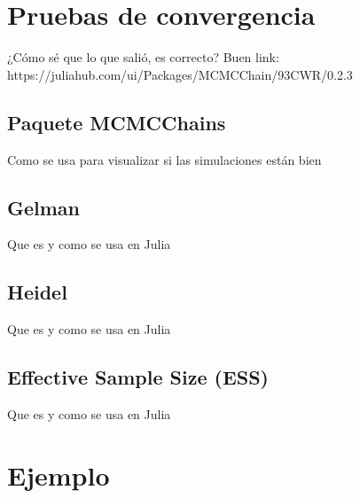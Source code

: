 \section{Pruebas de convergencia}
¿Cómo sé que lo que salió, es correcto?
Buen link: https://juliahub.com/ui/Packages/MCMCChain/93CWR/0.2.3

\subsection{Paquete MCMCChains}
Como se usa para visualizar si las simulaciones están bien

\subsection{Gelman}
Que es y como se usa en Julia

\subsection{Heidel}
Que es y como se usa en Julia

\subsection{Effective Sample Size (ESS)}
Que es y como se usa en Julia

\section{Ejemplo}